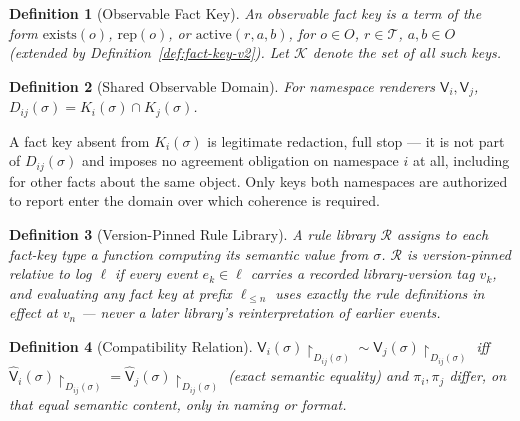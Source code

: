 \documentclass[11pt]{article}
\newtheorem{definition}{Definition}[section]
\begin{document}
\begin{definition}[Observable Fact Key]
\label{def:fact-key}
An observable fact key is a term of the form $\mathrm{exists}(o)$, $\mathrm{rep}(o)$, or $\mathrm{active}(r,a,b)$, for $o \in O$, $r \in \mathcal{T}$, $a,b \in O$ (extended by Definition~\ref{def:fact-key-v2}). Let $\mathcal{K}$ denote the set of all such keys.
\end{definition}

\begin{definition}[Shared Observable Domain]
\label{def:shared-domain}
For namespace renderers $\mathsf{V}_i, \mathsf{V}_j$, $D_{ij}(\sigma) = K_i(\sigma) \cap K_j(\sigma)$.
\end{definition}

A fact key absent from $K_i(\sigma)$ is legitimate redaction, full stop --- it is not part of $D_{ij}(\sigma)$ and imposes no agreement obligation on namespace $i$ at all, including for other facts about the same object. Only keys both namespaces are authorized to report enter the domain over which coherence is required.

\begin{definition}[Version-Pinned Rule Library]
\label{def:version-pinned}
A rule library $\mathcal{R}$ assigns to each fact-key type a function computing its semantic value from $\sigma$. $\mathcal{R}$ is version-pinned relative to log $\ell$ if every event $e_k \in \ell$ carries a recorded library-version tag $v_k$, and evaluating any fact key at prefix $\ell_{\le n}$ uses exactly the rule definitions in effect at $v_n$ --- never a later library's reinterpretation of earlier events.
\end{definition}

\begin{definition}[Compatibility Relation]
\label{def:compatibility-v2}
$\mathsf{V}_i(\sigma)\!\restriction_{D_{ij}(\sigma)} \sim \mathsf{V}_j(\sigma)\!\restriction_{D_{ij}(\sigma)}$ iff $\widehat{\mathsf{V}}_i(\sigma)\!\restriction_{D_{ij}(\sigma)} = \widehat{\mathsf{V}}_j(\sigma)\!\restriction_{D_{ij}(\sigma)}$ (exact semantic equality) and $\pi_i, \pi_j$ differ, on that equal semantic content, only in naming or format.
\end{definition}
\end{document}

